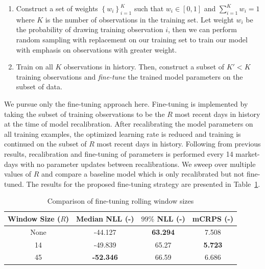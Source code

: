 \begin{enumerate}
    \item Construct a set of weights $\left\{ w_i \right\}_{i=1}^K$ such that $w_i \in [0, 1]$ and
    $\sum_{i=1}^K w_i = 1$ where $K$ is the number of observations in the training set.
    Let weight $w_i$ be the probability of drawing training observation $i$, then we can perform random sampling with
    replacement on our training set to train our model with emphasis on observations with greater weight.
    \item Train on all $K$ observations in history.
    Then, construct a subset of $K' < K$ training observations and \textit{fine-tune} the trained model parameters on
    the subset of data.
\end{enumerate}

We pursue only the fine-tuning approach here.
Fine-tuning is implemented by taking the subset of training observations to be the $R$ most recent
days in history at the time of model recalibration.
After recalibrating the model parameters on all training examples, the optimized learning rate is reduced and training
is continued on the subset of $R$ most recent days in history.
Following from previous results, recalibration and fine-tuning of parameters is performed every 14 market-days with no
parameter updates between recalibrations.
We sweep over multiple values of $R$ and compare a baseline model which is only recalibrated but not fine-tuned.
The results for the proposed fine-tuning strategy are presented in Table~\ref{tab:finetune}.

\begin{table}[htb]
    \caption[Results of rolling window fine-tuning]{
        Comparison of fine-tuning rolling window sizes
    }
    \begin{center}
        \begin{tabular}{||c|c|c|c||} \hline
        Window Size ($R$) & Median NLL (-)  & $99\%$ NLL (-) & mCRPS (-)  \\	%
        \hline \hline
        None &          -44.127  & \textbf{63.294} &         7.508  \\ \hline
        14   &          -49.839  &         65.27   & \textbf{5.723} \\ \hline
        45   &  \textbf{-52.346} &         66.59   &         6.686  \\ \hline
        \end{tabular}
        \\ \rule{0mm}{5mm}
    \end{center}
    \label{tab:finetune}
\end{table}

